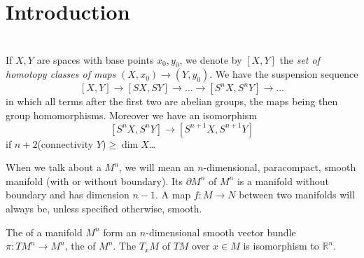 \documentclass[a4paper]{article}
\begin{document}
\maketitle
{}
\tableofcontents
{}

\setcounter{section}{-1}

\section{Introduction}

\section{}


\begin{definition}[]
    If $X,Y$ are spaces with base points $x_0,y_0$, we denote by $[X,Y]$ the \emph{set of homotopy classes of maps} $(X,x_0)\to(Y,y_0)$. We have the suspension sequence 
    \[[X,Y]\to[SX,SY]\to\dots\to[S^n X,S^n Y]\to\dots\]
    in which all terms after the first two are abelian groups, the maps being then group homomorphisms.
    Moreover we have an isomorphism 
    \[[S^n X, S^n Y]\to[S^{n+1} X, S^{n+1} Y]\]
    if $n+2$(connectivity $Y$)$\geq\dim X$\dots
\end{definition}\cite[p.1]{atiyah}

\begin{definition}[Manifold]
  When we talk about a  $M^n$, we will mean an $n$-dimensional, paracompact, smooth manifold (with or without boundary).
  Its  $\partial M^n$ of $M^n$ is a manifold without boundary and has dimension $n-1$.
  A map $f:M\to N$ between two manifolds will always be, unless specified otherwise, smooth.
\end{definition}\cite[p.1]{brocker}

\begin{definition}
  The  of a manifold $M^n$ form an $n$-dimensional smooth vector bundle $\pi:TM^n\to M^n$, the  of $M^n$.
  The  $T_xM$ of $TM$ over $x\in M$ is isomorphism to $\mathbb{R}^n$.
\end{definition}\cite[p.1]{brocker}
\end{document}
